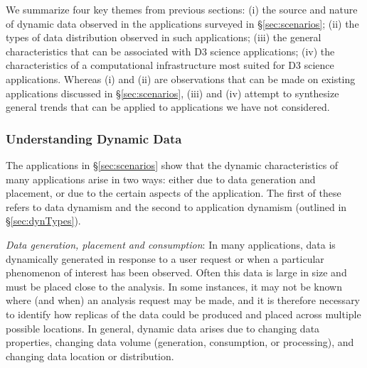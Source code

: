 We summarize four key themes from previous sections: (i) the source and nature
of dynamic data observed in the applications surveyed in \S\ref{sec:scenarios};
(ii) the types of data distribution observed in such applications; (iii) the
general characteristics that can be associated with D3 science applications;
(iv) the characteristics of a computational infrastructure most suited for D3
science applications.  Whereas (i) and (ii) are observations that can be made on
existing applications discussed in \S\ref{sec:scenarios}, (iii) and (iv) attempt
to synthesize general trends that can be applied to applications we have not
considered.






\subsubsection{Understanding Dynamic Data }

The applications in \S\ref{sec:scenarios} show that the dynamic characteristics
of many applications arise in two ways: either due to data generation and
placement, or due to the certain aspects of the application.  The first
of these refers to data dynamism and the second to application dynamism
(outlined in \S\ref{sec:dynTypes}).


\emph{Data generation, placement and consumption}: In many
applications, data is dynamically generated in response to a user
request or when a particular phenomenon of interest has been
observed. Often this data is large in size and must be placed close to
the analysis. In some instances, it may not be
known where (and when) an analysis request may be made, and it is
therefore necessary to identify how replicas of the data could be
produced and placed across multiple possible locations.  In general,
dynamic data arises due to changing data properties, changing data
volume (generation, consumption, or processing), and changing data
location or distribution.


